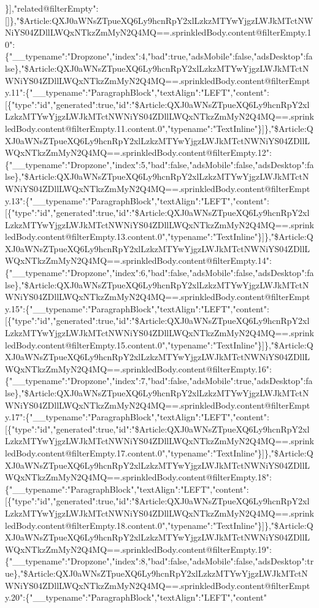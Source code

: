 \}{]},"related@filterEmpty":{[}{]}\},"\$Article:QXJ0aWNsZTpueXQ6Ly9hcnRpY2xlLzkzMTYwYjgzLWJkMTctNWNiYS04ZDllLWQxNTkzZmMyN2Q4MQ==.sprinkledBody.content@filterEmpty.10":\{"\_\_typename":"Dropzone","index":4,"bad":true,"adsMobile":false,"adsDesktop":false\},"\$Article:QXJ0aWNsZTpueXQ6Ly9hcnRpY2xlLzkzMTYwYjgzLWJkMTctNWNiYS04ZDllLWQxNTkzZmMyN2Q4MQ==.sprinkledBody.content@filterEmpty.11":\{"\_\_typename":"ParagraphBlock","textAlign":"LEFT","content":{[}\{"type":"id","generated":true,"id":"\$Article:QXJ0aWNsZTpueXQ6Ly9hcnRpY2xlLzkzMTYwYjgzLWJkMTctNWNiYS04ZDllLWQxNTkzZmMyN2Q4MQ==.sprinkledBody.content@filterEmpty.11.content.0","typename":"TextInline"\}{]}\},"\$Article:QXJ0aWNsZTpueXQ6Ly9hcnRpY2xlLzkzMTYwYjgzLWJkMTctNWNiYS04ZDllLWQxNTkzZmMyN2Q4MQ==.sprinkledBody.content@filterEmpty.12":\{"\_\_typename":"Dropzone","index":5,"bad":false,"adsMobile":false,"adsDesktop":false\},"\$Article:QXJ0aWNsZTpueXQ6Ly9hcnRpY2xlLzkzMTYwYjgzLWJkMTctNWNiYS04ZDllLWQxNTkzZmMyN2Q4MQ==.sprinkledBody.content@filterEmpty.13":\{"\_\_typename":"ParagraphBlock","textAlign":"LEFT","content":{[}\{"type":"id","generated":true,"id":"\$Article:QXJ0aWNsZTpueXQ6Ly9hcnRpY2xlLzkzMTYwYjgzLWJkMTctNWNiYS04ZDllLWQxNTkzZmMyN2Q4MQ==.sprinkledBody.content@filterEmpty.13.content.0","typename":"TextInline"\}{]}\},"\$Article:QXJ0aWNsZTpueXQ6Ly9hcnRpY2xlLzkzMTYwYjgzLWJkMTctNWNiYS04ZDllLWQxNTkzZmMyN2Q4MQ==.sprinkledBody.content@filterEmpty.14":\{"\_\_typename":"Dropzone","index":6,"bad":false,"adsMobile":false,"adsDesktop":false\},"\$Article:QXJ0aWNsZTpueXQ6Ly9hcnRpY2xlLzkzMTYwYjgzLWJkMTctNWNiYS04ZDllLWQxNTkzZmMyN2Q4MQ==.sprinkledBody.content@filterEmpty.15":\{"\_\_typename":"ParagraphBlock","textAlign":"LEFT","content":{[}\{"type":"id","generated":true,"id":"\$Article:QXJ0aWNsZTpueXQ6Ly9hcnRpY2xlLzkzMTYwYjgzLWJkMTctNWNiYS04ZDllLWQxNTkzZmMyN2Q4MQ==.sprinkledBody.content@filterEmpty.15.content.0","typename":"TextInline"\}{]}\},"\$Article:QXJ0aWNsZTpueXQ6Ly9hcnRpY2xlLzkzMTYwYjgzLWJkMTctNWNiYS04ZDllLWQxNTkzZmMyN2Q4MQ==.sprinkledBody.content@filterEmpty.16":\{"\_\_typename":"Dropzone","index":7,"bad":false,"adsMobile":true,"adsDesktop":false\},"\$Article:QXJ0aWNsZTpueXQ6Ly9hcnRpY2xlLzkzMTYwYjgzLWJkMTctNWNiYS04ZDllLWQxNTkzZmMyN2Q4MQ==.sprinkledBody.content@filterEmpty.17":\{"\_\_typename":"ParagraphBlock","textAlign":"LEFT","content":{[}\{"type":"id","generated":true,"id":"\$Article:QXJ0aWNsZTpueXQ6Ly9hcnRpY2xlLzkzMTYwYjgzLWJkMTctNWNiYS04ZDllLWQxNTkzZmMyN2Q4MQ==.sprinkledBody.content@filterEmpty.17.content.0","typename":"TextInline"\}{]}\},"\$Article:QXJ0aWNsZTpueXQ6Ly9hcnRpY2xlLzkzMTYwYjgzLWJkMTctNWNiYS04ZDllLWQxNTkzZmMyN2Q4MQ==.sprinkledBody.content@filterEmpty.18":\{"\_\_typename":"ParagraphBlock","textAlign":"LEFT","content":{[}\{"type":"id","generated":true,"id":"\$Article:QXJ0aWNsZTpueXQ6Ly9hcnRpY2xlLzkzMTYwYjgzLWJkMTctNWNiYS04ZDllLWQxNTkzZmMyN2Q4MQ==.sprinkledBody.content@filterEmpty.18.content.0","typename":"TextInline"\}{]}\},"\$Article:QXJ0aWNsZTpueXQ6Ly9hcnRpY2xlLzkzMTYwYjgzLWJkMTctNWNiYS04ZDllLWQxNTkzZmMyN2Q4MQ==.sprinkledBody.content@filterEmpty.19":\{"\_\_typename":"Dropzone","index":8,"bad":false,"adsMobile":false,"adsDesktop":true\},"\$Article:QXJ0aWNsZTpueXQ6Ly9hcnRpY2xlLzkzMTYwYjgzLWJkMTctNWNiYS04ZDllLWQxNTkzZmMyN2Q4MQ==.sprinkledBody.content@filterEmpty.20":\{"\_\_typename":"ParagraphBlock","textAlign":"LEFT","content"
